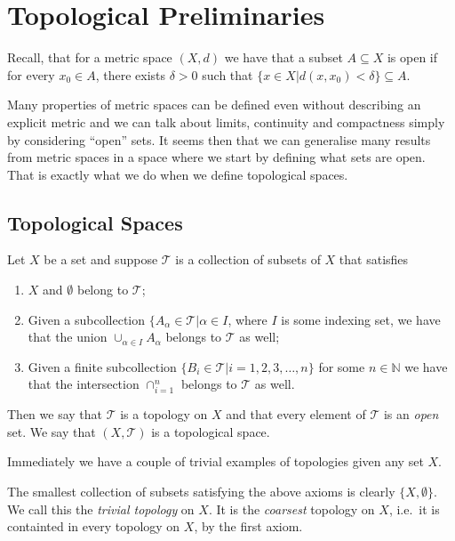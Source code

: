 \section{Topological Preliminaries}
\label{sec:prelims}

Recall, that for a metric space $(X,d)$ we have that a subset $A
\subseteq X$ is open if for every $x_0 \in A$, there exists $\delta >
0$ such that $\{x \in X | d(x,x_0) < \delta\} \subseteq A$.

Many properties of metric spaces can be defined even without
describing an explicit metric and we can talk about limits, continuity
and compactness simply by considering ``open'' sets. It seems then
that we can generalise many results from metric spaces in a space
where we start by defining what sets are open. That is exactly what we
do when we define topological spaces.

\subsection{Topological Spaces}
\label{sec:prelims:topospace}

\begin{defn}
  Let $X$ be a set and suppose $\mathscr{T}$ is a collection of
  subsets of $X$ that satisfies
  \begin{enumerate}
  \item $X$ and $\emptyset$ belong to $\mathscr{T}$;
  \item Given a subcollection $\{A_\alpha \in \mathscr{T} | \alpha \in
    I$, where $I$ is some indexing set, we have that the union
    $\cup_{\alpha \in I}A_\alpha$ belongs to $\mathscr{T}$ as well;
  \item Given a finite subcollection $\{B_i \in \mathscr{T} | i =
    1,2,3,\dots, n \}$ for some $n \in \mathbb{N}$ we have that the
    intersection $\cap_{i = 1}^{n}$ belongs to $\mathscr{T}$ as well.
  \end{enumerate}
  Then we say that $\mathscr{T}$ is a topology on $X$ and that every
  element of $\mathscr{T}$ is an \emph{open} set. We say that
  $(X,\mathscr{T})$ is a topological space.
\end{defn}

Immediately we have a couple of trivial examples of topologies given
any set $X$.

\begin{exmp}
  \label{exmp:trivial}
  The smallest collection of subsets satisfying the above axioms is
  clearly $\{ X, \emptyset \}$. We call this the \emph{trivial
    topology} on $X$. It is the \emph{coarsest} topology on $X$, i.e.\
  it is containted in every topology on $X$, by the first axiom.
\end{exmp}

